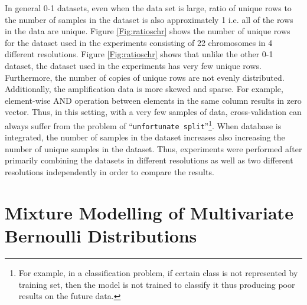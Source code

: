In general 0-1 datasets, even when the data set is large, ratio of unique rows to the number of samples in the dataset is also approximately 1 i.e. all of the rows in the data are unique. Figure \ref{Fig:ratioschr} shows the number of unique rows for the dataset used in the experiments consisting of 22 chromosomes in 4 different resolutions. Figure \ref{Fig:ratioschr} shows that unlike the other \mbox{0-1} dataset, the dataset used in the experiments has very few unique rows. Furthermore, the number of copies of unique rows are not evenly distributed. Additionally, the amplification data is more skewed and sparse. For example, element-wise AND operation between elements in the same column results in zero vector. Thus, in this setting, with a very few samples of data, cross-validation can always suffer from the problem of ``\texttt{unfortunate split}''\footnote{For example, in a classification problem, if certain class is not represented by training set, then the model is not trained to classify it thus producing poor results on the future data.}. When database is integrated, the number of samples in the dataset increases also increasing the number of unique samples in the dataset. Thus, experiments were performed after primarily combining the datasets in different resolutions as well as two different resolutions independently in order to compare the results.

\section{Mixture Modelling of Multivariate Bernoulli Distributions}
\label{s:mmmbd}
